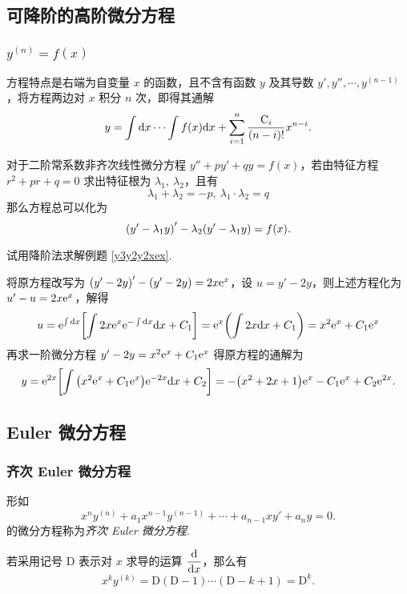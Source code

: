 \subsection{可降阶的高阶微分方程}

\subsubsection{$y^{(n)}=f(x)$}

方程特点是右端为自变量 $x$ 的函数，且不含有函数 $y$ 及其导数 $y',y'',\cdots,y^{(n-1)}$，将方程两边对 $x$ 积分 $n$ 次，即得其通解
$$y=\int\dd x\cdots\int f(x)\dd x+\sum_{i=1}^{n}\dfrac{\mathrm{C}_i}{(n-i)!}x^{n-i}.$$

\begin{theorem}
    对于二阶常系数非齐次线性微分方程 $y''+py'+qy=f(x)$，若由特征方程 $r^2+pr+q=0$ 求出特征根为 $\lambda_1,~\lambda_2$，且有
    $$\lambda_1+\lambda_2=-p,~\lambda_1\cdot\lambda_2=q$$
    那么方程总可以化为 $$\qty(y'-\lambda_1y)'-\lambda_2\qty(y'-\lambda_1y)=f(x).$$
\end{theorem}

\begin{example}
    试用降阶法求解例题 \ref{y3y2y2xex}.
\end{example}
\begin{solution}
    将原方程改写为 $\qty(y'-2y)'-(y'-2y)=2x\mathrm{e} ^x$，设 $u=y'-2y$，则上述方程化为 $u'-u=2x\mathrm{e} ^x$，解得
    $$u=\mathrm{e} ^{\int\dd x}\qty[\int 2x\mathrm{e} ^x\mathrm{e} ^{-\int\dd x}\dd x+C_1]=\mathrm{e} ^x\qty(\int 2x\dd x+C_1)=x^2\mathrm{e} ^x+C_1\mathrm{e} ^x$$
    再求一阶微分方程 $y'-2y=x^2\mathrm{e} ^x+C_1\mathrm{e} ^x$ 得原方程的通解为
    $$y=\mathrm{e} ^{2x}\qty[\int\qty(x^2\mathrm{e} ^x+C_1\mathrm{e} ^x)\mathrm{e} ^{-2x}\dd x+C_2]=-\qty(x^2+2x+1)\mathrm{e} ^x-C_1\mathrm{e} ^x+C_2\mathrm{e} ^{2x}.$$
\end{solution}

\subsection{Euler 微分方程}

\subsubsection{齐次 Euler 微分方程}

\begin{definition}
    形如 $$x^ny^{(n)}+a_1x^{n-1}y^{(n-1)}+\cdots+a_{n-1}xy'+a_ny=0.$$
    的微分方程称为\textit{齐次 Euler 微分方程}.
\end{definition}

\begin{theorem}
    若采用记号 $\mathrm{D}$ 表示对 $x$ 求导的运算 $\displaystyle\dv{x}$，那么有
    $$x^ky^{(k)}=\mathrm{D}(\mathrm{D}-1)\cdots(\mathrm{D}-k+1)=\mathrm{D}^{\underline{k}}.$$
\end{theorem}

